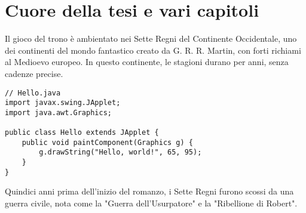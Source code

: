 \chapter{Cuore della tesi e vari capitoli}

Il gioco del trono è ambientato nei Sette Regni del Continente Occidentale, uno dei continenti del mondo fantastico creato da G. R. R. Martin, con forti richiami al Medioevo europeo. In questo continente, le stagioni durano per anni, senza cadenze precise.



\begin{lstlisting}
// Hello.java
import javax.swing.JApplet;
import java.awt.Graphics;

public class Hello extends JApplet {
	public void paintComponent(Graphics g) {
		g.drawString("Hello, world!", 65, 95);
	}    
}
\end{lstlisting}

Quindici anni prima dell'inizio del romanzo, i Sette Regni furono scossi da una guerra civile, nota come la "Guerra dell'Usurpatore" e la "Ribellione di Robert". 

